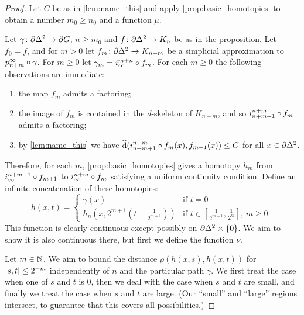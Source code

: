 \documentclass[a4paper]{article}
\begin{document}
\begin{proof}
  Let $C$ be as in \cref{lem:name_this} and apply \cref{prop:basic_homotopies}
  to obtain a number $m_0\geq n_0$ and a function $\mu$. 
  
  Let $\gamma\colon\partial\Delta^2\to\partial G$, $n\geq m_0$ and
  $f\colon\partial\Delta^2\to K_n$ be as in the proposition. Let $f_0 = f$,
  and for $m > 0$ let $f_m\colon\partial\Delta^2\to K_{n+m}$ be a
  simplicial approximation to $p^\infty_{n+m}\circ\gamma$. For $m \geq 0$
  let $\gamma_m = i^{m+n}_\infty\circ f_m$. For each $m\geq 0$ the
  following observations are immediate:
  \begin{enumerate}
    \item the map $f_m$ admits a factoring;
    \item the image of $f_m$ is contained in the $d$-skeleton of $K_{n+m}$, and
      so $i^{n+m}_{n+m+1}\circ f_m$ admits a factoring;
    \item by \cref{lem:name_this} we have $\operatorname{\widehat{d}}(i^{n+m}_{n+m+1}\circ
      f_m(x), f_{m+1}(x)) \leq C$ for all $x \in \partial\Delta^2$.
  \end{enumerate}
  Therefore, for each $m$, \cref{prop:basic_homotopies} gives a homotopy $h_m$
  from $i^{n+m+1}_\infty\circ f_{m+1}$ to $i^{n+m}_\infty \circ f_m$
  satisfying a uniform continuity condition. Define an infinite concatenation
  of these homotopies:
  \begin{equation*}
    h(x,t) = 
    \begin{cases}
      \gamma(x) & \text{if } t = 0\\
      h_n\left(x,2^{m+1}\left(t-\frac{1}{2^{m+1}}\right)\right) 
              & \text{if $t \in \left[\frac{1}{2^{m+1}}, \frac{1}{2^m}\right]$
                    , $m\geq 0$}.
    \end{cases}
  \end{equation*}
  This function is clearly continuous except possibly on
  $\partial\Delta^2\times\{0\}$. We aim to show it is also continuous
  there, but first we define the function $\nu$. 

  Let $m \in \mathbb{N}$. We aim to bound the distance $\rho(h(x,s), h(x,t))$
  for $\left|s,t\right| \leq 2^{-m}$ independently of $n$ and the particular path
  $\gamma$. We first treat the case when one of $s$ and $t$ is $0$, then we
  deal with the case when $s$ and $t$ are small, and finally we treat the case
  when $s$ and $t$ are large. (Our ``small'' and ``large'' regions intersect,
  to guarantee that this covers all possibilities.)


\end{proof}
\end{document}
